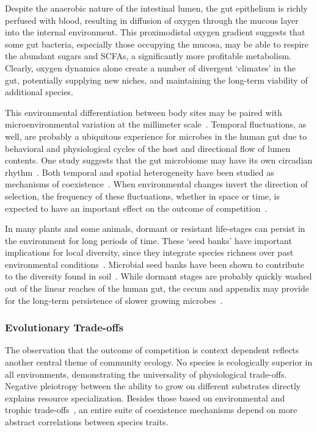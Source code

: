 \documentclass[12pt]{article}
\begin{document}
Despite the anaerobic nature of the intestinal lumen,
the gut epithelium is richly perfused with blood, resulting
in diffusion of oxygen through the mucous layer into
the internal environment.
This proximodistal oxygen gradient suggests that some
gut bacteria, especially those occupying the mucosa,
may be able to respire the abundant sugars and SCFAs,
a significantly more profitable metabolism.
Clearly, oxygen dynamics alone create a number of
divergent `climates' in the gut,
potentially supplying new niches,
and maintaining the long-term viability of additional
species.

This environmental differentiation between body sites may be
paired with microenvironmental variation at the millimeter
scale~\citep{TODO}.
Temporal fluctuations, as well, are probably a ubiquitous
experience for microbes in the human gut due to behavioral and physiological
cycles of the host and directional flow of lumen contents.
One study suggests that the gut microbiome may have
its own circadian rhythm~\citep{Thaiss2014}.
Both temporal and spatial heterogeneity have been studied as
mechanisms of coexistence~\citep{Chesson2000}.
When environmental changes invert the direction of selection,
the frequency of these fluctuations, whether in space or time,
is expected to have an important effect on the outcome of
competition~\citep{Hutchinson1961}.

In many plants and some animals, dormant or resistant life-stages can persist
in the environment for long periods of time.
These `seed banks' have important implications for local diversity,
since they integrate species richness
over past environmental conditions~\citep{TODO}.
Microbial seed banks have been shown to contribute to the diversity found in
soil~\citep{LennonTODO}.
While dormant stages are probably quickly washed out of the linear
reaches of the human gut,
the cecum and appendix may provide for the long-term persistence
of slower growing microbes~\citep{TODO}.

\subsubsection{Evolutionary Trade-offs}
The observation that the outcome of competition is context
dependent reflects another central theme of community ecology.
No species is ecologically superior in all environments,
demonstrating the universality of physiological trade-offs.
Negative pleiotropy between the ability to grow on
different substrates directly explains resource specialization.
Besides those based on environmental
and trophic trade-offs~\citep{Litchman2007},
an entire suite of coexistence mechanisms
depend on more abstract correlations between species traits.
\end{document}

